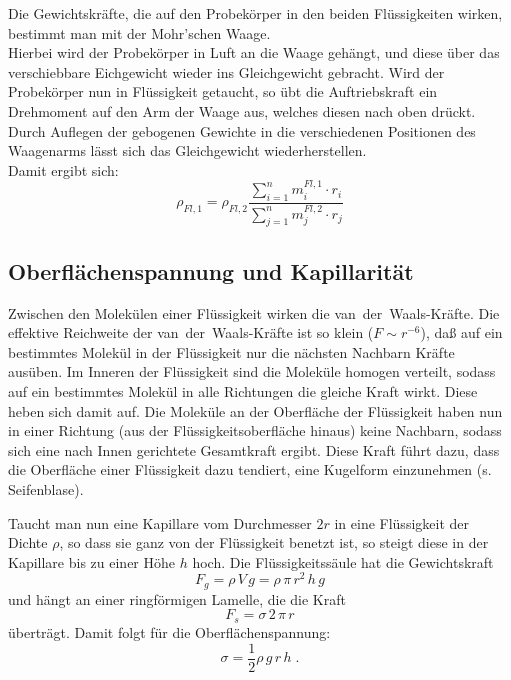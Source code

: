 Die Gewichtskräfte, die auf den Probekörper in den beiden Flüssigkeiten wirken, bestimmt man mit der Mohr'schen Waage. \\
Hierbei wird der Probekörper in Luft an die Waage gehängt, und diese über das verschiebbare Eichgewicht wieder ins Gleichgewicht gebracht. Wird der Probekörper nun in Flüssigkeit getaucht, so übt die Auftriebskraft ein Drehmoment auf den Arm der Waage aus, welches diesen nach oben drückt. Durch Auflegen der gebogenen Gewichte in die verschiedenen Positionen des Waagenarms lässt sich das Gleichgewicht wiederherstellen.\\
Damit ergibt sich:
\begin{equation}
 \rho_{Fl,1} = \rho_{Fl,2}\frac{\sum_{i=1}^n{m_i^{Fl,1}\cdot r_i}}{\sum_{j=1}^n{m_j^{Fl,2}\cdot r_j}}
\end{equation}

\subsection{Oberflächenspannung und Kapillarität}

Zwischen den Molekülen einer Flüssigkeit wirken die van~der~Waals-Kräfte. Die effektive Reichweite der van~der~Waals-Kräfte ist so klein ($F\sim r^{-6}$), daß auf ein bestimmtes Molekül in der Flüssigkeit nur die nächsten Nachbarn Kräfte ausüben. Im Inneren der Flüssigkeit sind die Moleküle homogen verteilt, sodass auf ein bestimmtes Molekül in alle Richtungen die gleiche Kraft wirkt. Diese heben sich damit auf. Die Moleküle an der Oberfläche der Flüssigkeit haben nun in einer Richtung (aus der Flüssigkeitsoberfläche hinaus) keine Nachbarn, sodass sich eine nach Innen gerichtete Gesamtkraft ergibt. Diese Kraft führt dazu, dass die Oberfläche einer Flüssigkeit dazu tendiert, eine Kugelform einzunehmen (s. Seifenblase).

Taucht man nun eine Kapillare vom Durchmesser $2r$ in eine Flüssigkeit der Dichte $\rho$, so dass sie ganz von der Flüssigkeit benetzt ist, so steigt diese in der Kapillare bis zu einer Höhe $h$ hoch. Die Flüssigkeitssäule hat die Gewichtskraft
\begin{equation}
 F_g = \rho\, V\, g = \rho\,\pi\, r^2\, h\, g
\end{equation}
und hängt an einer ringförmigen Lamelle, die die Kraft
\begin{equation}
 F_s = \sigma\, 2\,\pi\, r
\end{equation}
überträgt. Damit folgt für die Oberflächenspannung:
\begin{equation} \label{eq:Oberflaechenspannung}
 \sigma = \frac{1}{2}\rho\,g\,r\,h\; .
\end{equation}

